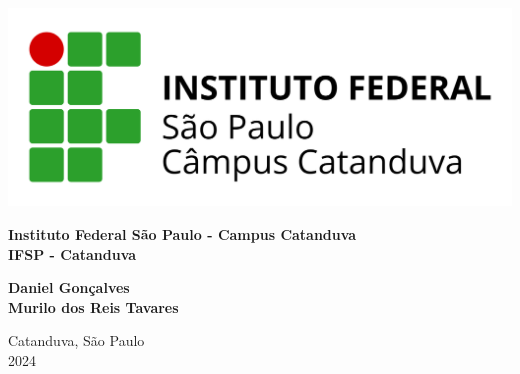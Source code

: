 \thispagestyle{empty}
    \begin{center}
        \includegraphics[scale=0.25]{imagem/ifsp-ctd.png}
        
        \Large \textbf{Instituto Federal São Paulo - Campus Catanduva}\\
        \large \textbf{IFSP - Catanduva}
        \vspace{4.5 cm}
        
        \Large \textbf{Daniel Gonçalves}\\
        \Large \textbf{Murilo dos Reis Tavares}\\
    \end{center}

    \begin{center}
        \vspace{7 cm}
        Catanduva, São Paulo \\
        2024
    \end{center}